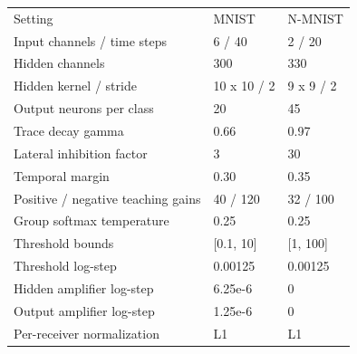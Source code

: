 \begin{tabular}{lll}
\hline
Setting & MNIST & N-MNIST \\
Input channels / time steps & 6 / 40 & 2 / 20 \\
Hidden channels & 300 & 330 \\
Hidden kernel / stride & 10 x 10 / 2 & 9 x 9 / 2 \\
Output neurons per class & 20 & 45 \\
Trace decay gamma & 0.66 & 0.97 \\
Lateral inhibition factor & 3 & 30 \\
Temporal margin & 0.30 & 0.35 \\
Positive / negative teaching gains & 40 / 120 & 32 / 100 \\
Group softmax temperature & 0.25 & 0.25 \\
Threshold bounds & [0.1, 10] & [1, 100] \\
Threshold log-step & 0.00125 & 0.00125 \\
Hidden amplifier log-step & 6.25e-6 & 0 \\
Output amplifier log-step & 1.25e-6 & 0 \\
Per-receiver normalization & L1 & L1 \\
\hline
\end{tabular}
